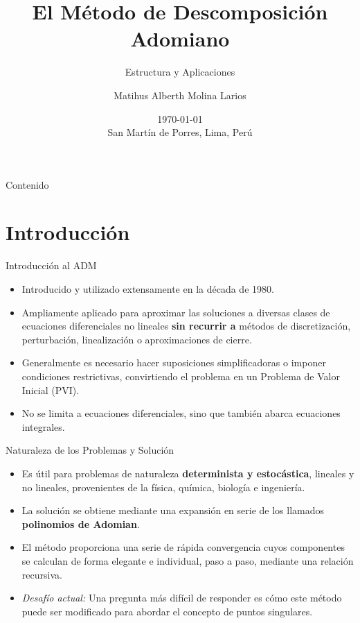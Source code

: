 \documentclass[
    8pt,
    aspectratio=1610,
    c,
    spanish,
    handout,
    intlimits,
    leqno,
    professionalfonts,
    spanish,
    xcolor=svgnames,
]{beamer}
\title[Método Adomiano (ADM)]{El Método de Descomposición Adomiano}
\subtitle{Estructura y Aplicaciones}
\author[Matihus Molina]{Matihus Alberth Molina Larios}
\institute[UNMSM]{
	Universidad Nacional Mayor de San Marcos \\
	Facultad de Ciencias Matemáticas / Matemática 
}
\date[Abril 2026]{\today\\ San Martín de Porres, Lima, Perú}
\begin{document}
\begin{frame}
	\titlepage
\end{frame}

\begin{frame}{Contenido}
	\tableofcontents
\end{frame}

\section{Introducción}

\begin{frame}{Introducción al ADM}
	\begin{itemize}
		\item Introducido y utilizado extensamente en la década de 1980.\cite{Abello_Res_2016}
		\item Ampliamente aplicado para aproximar las soluciones a diversas clases de ecuaciones diferenciales no lineales \textbf{sin recurrir a} métodos de discretización, perturbación, linealización o aproximaciones de cierre.\cite{Abello_Res_2016}
		\item Generalmente es necesario hacer suposiciones simplificadoras o imponer condiciones restrictivas, convirtiendo el problema en un Problema de Valor Inicial (PVI).\cite{Mak2021}
		\item No se limita a ecuaciones diferenciales, sino que también abarca ecuaciones integrales.
	\end{itemize}
\end{frame}

\begin{frame}{Naturaleza de los Problemas y Solución}
	\begin{itemize}
		\item Es útil para problemas de naturaleza \textbf{determinista y estocástica}, lineales y no lineales, provenientes de la física, química, biología e ingeniería.\cite{Abello_Res_2016}
		\item La solución se obtiene mediante una expansión en serie de los llamados \textbf{polinomios de Adomian}.
		\item El método proporciona una serie de rápida convergencia cuyos componentes se calculan de forma elegante e individual, paso a paso, mediante una relación recursiva.\cite{Wazwaz2001}
		\item \textit{Desafío actual:} Una pregunta más difícil de responder es cómo este método puede ser modificado para abordar el concepto de puntos singulares.\cite{Wazwaz2001}
	\end{itemize}
\end{frame}
\end{document}
